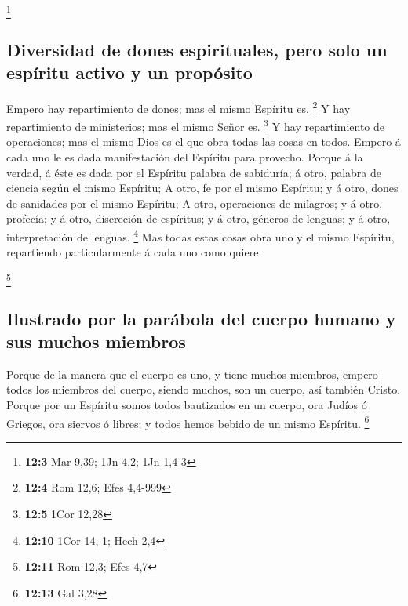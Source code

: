 \footnote{\textbf{12:3} Mar 9,39; 1Jn 4,2; 1Jn 1,4-3}

\hypertarget{diversidad-de-dones-espirituales-pero-solo-un-espuxedritu-activo-y-un-propuxf3sito}{%
\subsection{Diversidad de dones espirituales, pero solo un espíritu
activo y un
propósito}\label{diversidad-de-dones-espirituales-pero-solo-un-espuxedritu-activo-y-un-propuxf3sito}}

 Empero hay repartimiento de dones; mas el mismo Espíritu
es. \footnote{\textbf{12:4} Rom 12,6; Efes 4,4-999}  Y hay
repartimiento de ministerios; mas el mismo Señor es. \footnote{\textbf{12:5}
  1Cor 12,28}  Y hay repartimiento de operaciones; mas el
mismo Dios es el que obra todas las cosas en todos.  Empero
á cada uno le es dada manifestación del Espíritu para provecho.
 Porque á la verdad, á éste es dada por el Espíritu palabra
de sabiduría; á otro, palabra de ciencia según el mismo Espíritu;
 A otro, fe por el mismo Espíritu; y á otro, dones de
sanidades por el mismo Espíritu;  A otro, operaciones de
milagros; y á otro, profecía; y á otro, discreción de espíritus; y á
otro, géneros de lenguas; y á otro, interpretación de lenguas.
\footnote{\textbf{12:10} 1Cor 14,-1; Hech 2,4}  Mas todas
estas cosas obra uno y el mismo Espíritu, repartiendo particularmente á
cada uno como quiere.

\footnote{\textbf{12:11} Rom 12,3; Efes 4,7}

\hypertarget{ilustrado-por-la-paruxe1bola-del-cuerpo-humano-y-sus-muchos-miembros}{%
\subsection{Ilustrado por la parábola del cuerpo humano y sus muchos
miembros}\label{ilustrado-por-la-paruxe1bola-del-cuerpo-humano-y-sus-muchos-miembros}}

 Porque de la manera que el cuerpo es uno, y tiene muchos
miembros, empero todos los miembros del cuerpo, siendo muchos, son un
cuerpo, así también Cristo.  Porque por un Espíritu somos
todos bautizados en un cuerpo, ora Judíos ó Griegos, ora siervos ó
libres; y todos hemos bebido de un mismo Espíritu. \footnote{\textbf{12:13}
  Gal 3,28}


